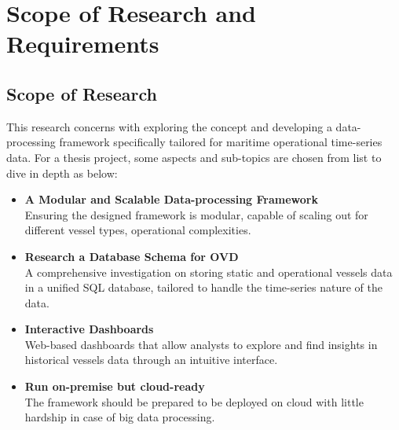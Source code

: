 

\chapter{Scope of Research and Requirements} \label{chap:scope}


\section{Scope of Research}
This research concerns with exploring the concept and developing a data-processing framework specifically tailored for maritime operational time-series data.
For a thesis project, some aspects and sub-topics are chosen from list to dive in depth as below:
\begin{itemize}
    \item \textbf{A Modular and Scalable Data-processing Framework} \\
     Ensuring the designed framework is modular, capable of scaling out for different vessel types, operational complexities.
    \item \textbf{Research a Database Schema for OVD} \\
    A comprehensive investigation on storing static and operational vessels data in a unified SQL database, tailored to handle the time-series nature of the data.
    \item \textbf{Interactive Dashboards} \\
    Web-based dashboards that allow analysts to explore and find insights in historical vessels data through an intuitive interface.
    \item \textbf{Run on-premise but cloud-ready} \\
    The framework should be prepared to be deployed on cloud with little hardship in case of big data processing.
\end{itemize} 

